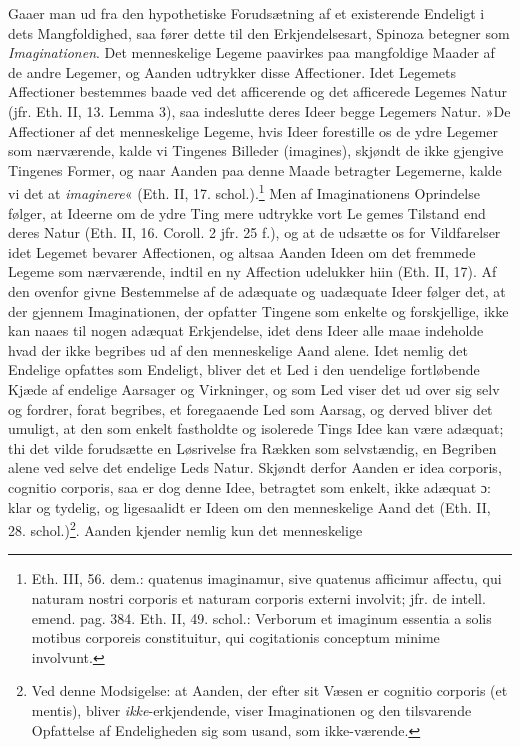 \documentclass[12pt,a4paper]{book}
\newcommand{\opage}[1]{\marginnote{\footnotesize\textit{[#1]}}}
\begin{document}
Gaaer man ud fra den hypothetiske Forudsætning af et
existerende Endeligt i dets Mangfoldighed, saa fører dette til
den Erkjendelsesart, Spinoza betegner som \emph{Imaginationen}. Det
menneskelige Legeme paavirkes paa mangfoldige Maader af de
andre Legemer, og Aanden udtrykker disse Affectioner. Idet
Legemets Affectioner bestemmes baade ved det afficerende og
det afficerede Legemes Natur (jfr. Eth. II, 13. Lemma 3), saa
indeslutte deres Ideer begge Legemers Natur. »De Affectioner
af det menneskelige Legeme, hvis Ideer forestille os de ydre
Legemer som nærværende, kalde vi Tingenes Billeder (imagines),
skjøndt de ikke gjengive Tingenes Former, og naar Aanden paa
denne Maade betragter Legemerne, kalde vi det at
\emph{imaginere}« (Eth. II, 17. schol.).\footnote{Eth. III,
56. dem.: quatenus imaginamur, sive quatenus afficimur
affectu, qui naturam nostri corporis et naturam corporis
externi involvit; jfr. de intell. emend. pag. 384. Eth. II,
49. schol.: Verborum et imaginum essentia a solis motibus
corporeis constituitur, qui cogitationis conceptum minime
involvunt.} Men af Imaginationens Oprindelse følger, at
Ideerne om de ydre Ting mere udtrykke vort Le\-%
\opage{89}\setcounter{footnote}{0}%
gemes Tilstand end deres Natur (Eth. II, 16. Coroll. 2 jfr. 25
f.), og at de udsætte os for Vildfarelser idet Legemet bevarer
Affectionen, og altsaa Aanden Ideen om det fremmede Legeme som
nærværende, indtil en ny Affection udelukker hiin (Eth. II,
17). Af den ovenfor givne Bestemmelse af de adæquate og
uadæquate Ideer følger det, at der gjennem Imaginationen, der
opfatter Tingene som enkelte og forskjellige, ikke kan naaes
til nogen adæquat Erkjendelse, idet dens Ideer alle maae
indeholde hvad der ikke begribes ud af den menneskelige Aand
alene. Idet nemlig det Endelige opfattes som Endeligt, bliver
det et Led i den uendelige fortløbende Kjæde af endelige
Aarsager og Virkninger, og som Led viser det ud over sig selv
og fordrer, forat begribes, et foregaaende Led som Aarsag, og
derved bliver det umuligt, at den som enkelt fastholdte og
isolerede Tings Idee kan være adæquat; thi det vilde
forudsætte en Løsrivelse fra Rækken som selvstændig, en
Begriben alene ved selve det endelige Leds Natur. Skjøndt
derfor Aanden er idea corporis, cognitio corporis, saa er dog
denne Idee, betragtet som enkelt, ikke adæquat ɔ: klar og
tydelig, og ligesaalidt er Ideen om den menneskelige Aand det
(Eth. II, 28. schol.)\footnote{Ved denne Modsigelse: at
Aanden, der efter sit Væsen er cognitio corporis (et mentis),
bliver \emph{ikke}-erkjendende, viser Imaginationen og den
tilsvarende Opfattelse af Endeligheden sig som usand, som
ikke-værende.}. Aanden kjender nemlig kun det menneskelige
\end{document}

